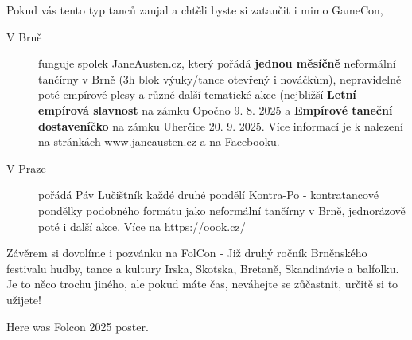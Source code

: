 {    Pokud vás tento typ tanců zaujal a chtěli byste si zatančit i mimo GameCon,
    \begin{description}
        \item[V Brně] funguje spolek JaneAusten.cz, který pořádá \textbf{jednou měsíčně} neformální tančírny v Brně (3h blok výuky/tance otevřený i nováčkům), nepravidelně poté empírové plesy a různé další tematické akce (nejbližší \textbf{Letní empírová slavnost} na zámku Opočno 9. 8. 2025 a \textbf{Empírové taneční dostaveníčko} na zámku Uherčice 20. 9. 2025. Více informací je k nalezení na stránkách www.janeausten.cz a na Facebooku.
        \item[V Praze] pořádá Páv Lučištník každé druhé pondělí Kontra-Po - kontratancové pondělky podobného formátu jako neformální tančírny v Brně, jednorázově poté i další akce. Více na https://oook.cz/
    \end{description}

    Závěrem si dovolíme i pozvánku na FolCon - Již druhý ročník Brněnského festivalu hudby, tance a kultury Irska, Skotska, Bretaně, Skandinávie a balfolku. Je to něco trochu jiného, ale pokud máte čas, neváhejte se zůčastnit, určitě si to užijete!
    \clearpage
    \begin{center}
    Here was Folcon 2025 poster.
    \clearpage  %
    \end{center}


    \cleardoublepage   %
}

